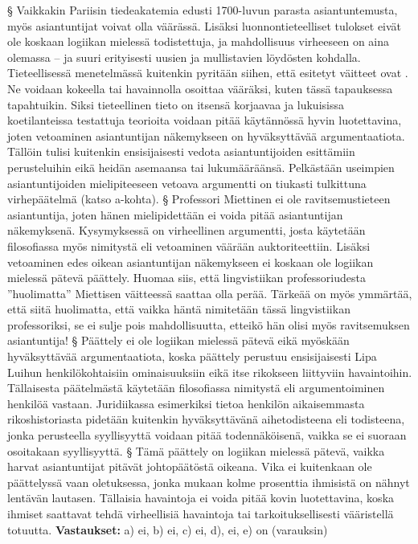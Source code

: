 \begin{esimerkki}
{        § Vaikkakin Pariisin tiedeakatemia edusti 1700-luvun parasta asiantuntemusta, myös asiantuntijat voivat olla väärässä. Lisäksi luonnontieteelliset tulokset eivät ole koskaan logiikan mielessä todistettuja, ja mahdollisuus virheeseen on aina olemassa -- ja suuri erityisesti uusien ja mullistavien löydösten kohdalla. Tieteellisessä menetelmässä kuitenkin pyritään siihen, että esitetyt väitteet ovat . Ne voidaan kokeella tai havainnolla osoittaa vääräksi, kuten tässä tapauksessa tapahtuikin. Siksi tieteellinen tieto on itsensä korjaavaa ja lukuisissa koetilanteissa testattuja teorioita voidaan pitää käytännössä hyvin luotettavina, joten vetoaminen asiantuntijan näkemykseen on hyväksyttävää argumentaatiota. Tällöin tulisi kuitenkin ensisijaisesti vedota asiantuntijoiden esittämiin perusteluihin eikä heidän asemaansa tai lukumääräänsä. Pelkästään useimpien asiantuntijoiden mielipiteeseen vetoava argumentti on tiukasti tulkittuna virhepäätelmä (katso a-kohta).
        § Professori Miettinen ei ole ravitsemustieteen asiantuntija, joten hänen mielipidettään ei voida pitää asiantuntijan näkemyksenä. Kysymyksessä on virheellinen argumentti, josta käytetään filosofiassa myös nimitystä  eli vetoaminen väärään auktoriteettiin. Lisäksi vetoaminen edes oikean asiantuntijan näkemykseen ei koskaan ole logiikan mielessä pätevä päättely. Huomaa siis, että lingvistiikan professoriudesta ''huolimatta'' Miettisen väitteessä saattaa olla perää. Tärkeää on myös ymmärtää, että siitä huolimatta, että vaikka häntä nimitetään tässä lingvistiikan professoriksi, se ei sulje pois mahdollisuutta, etteikö hän olisi myös ravitsemuksen asiantuntija!
        § Päättely ei ole logiikan mielessä pätevä eikä myöskään hyväksyttävää argumentaatiota, koska päättely perustuu ensisijaisesti Lipa Luihun henkilökohtaisiin ominaisuuksiin eikä itse rikokseen liittyviin havaintoihin. Tällaisesta päätelmästä käytetään filosofiassa nimitystä  eli argumentoiminen henkilöä vastaan. Juridiikassa esimerkiksi tietoa henkilön aikaisemmasta rikoshistoriasta pidetään kuitenkin hyväksyttävänä aihetodisteena eli todisteena, jonka perusteella syyllisyyttä voidaan pitää todennäköisenä, vaikka se ei suoraan osoitakaan syyllisyyttä.
        § Tämä päättely on logiikan mielessä pätevä, vaikka harvat asiantuntijat pitävät johtopäätöstä oikeana. Vika ei kuitenkaan ole päättelyssä vaan oletuksessa, jonka mukaan kolme prosenttia ihmisistä on nähnyt lentävän lautasen. Tällaisia havaintoja ei voida pitää kovin luotettavina, koska ihmiset saattavat tehdä virheellisiä havaintoja tai tarkoituksellisesti vääristellä totuutta.
        }
    \textbf{Vastaukset:}
        a) ei, b) ei, c) ei, d), ei, e) on (varauksin)
\end{esimerkki}


